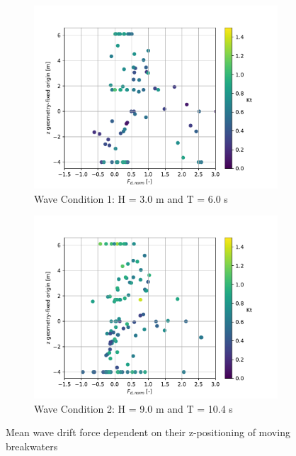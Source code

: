 \begin{figure}[h]
    \centering
    \begin{subfigure}[b]{0.49\textwidth}
        \centering
        \includegraphics[width=\linewidth]{figures/ComFLOW/Results moving/DI1/H3/Fd_norm_VS_top_bw_with_Kt.pdf}
        \caption[]%
        {{\small Wave Condition 1: H = 3.0 m and T = 6.0 s}}    
        \label{fig: Fd_norm_VS_top_bw_with_Kt DI1 H3 moving}
    \end{subfigure}
    \hfill
    \begin{subfigure}[b]{0.49\textwidth}
        \centering
        \includegraphics[width=\linewidth]{figures/ComFLOW/Results moving/DI1/H9/Fd_norm_VS_top_bw_with_Kt.pdf}
        \caption[]%
        {{\small Wave Condition 2: H = 9.0 m and T = 10.4 s}}    
        \label{fig: Fd_norm_VS_top_bw_with_Kt DI1 H9 moving}
    \end{subfigure}
    
    \caption{Mean wave drift force dependent on their z-positioning of moving breakwaters}
    \label{fig: }
\end{figure}


